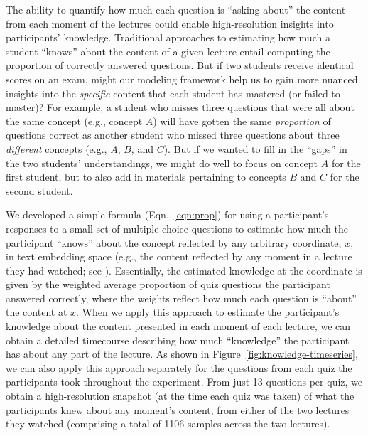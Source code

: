 \documentclass[10pt]{article}
\renewcommand{\nameref}[1]{\mbox{\textit{\oldnameref{#1}}}}
\begin{document}
The ability to quantify how much each question is ``asking about'' the content
from each moment of the lectures could enable high-resolution insights into
participants' knowledge. Traditional approaches to estimating how much a
student ``knows'' about the content of a given lecture entail computing the
proportion of correctly answered questions. But if two students receive
identical scores on an exam, might our modeling framework help us to gain more
nuanced insights into the \textit{specific} content that each student has
mastered (or failed to master)? For example, a student who misses three
questions that were all about the same concept (e.g., concept $A$) will have
gotten the same \textit{proportion} of questions correct as another student who
missed three questions about three \textit{different} concepts (e.g., $A$, $B$,
and $C$). But if we wanted to fill in the ``gaps'' in the two students'
understandings, we might do well to focus on concept $A$ for the first student,
but to also add in materials pertaining to concepts $B$ and $C$ for the second
student.

We developed a simple formula (Eqn.~\ref{eqn:prop}) for using a participant's
responses to a small set of multiple-choice questions to estimate how much the
participant ``knows'' about the concept reflected by any arbitrary coordinate,
$x$, in text embedding space (e.g., the content reflected by any moment in a
lecture they had watched; see \nameref{subsec:traces}).
Essentially, the estimated knowledge at the coordinate is given by the weighted
average proportion of quiz questions the participant answered correctly, where
the weights reflect how much each question is ``about'' the content at $x$.
When we apply this approach to estimate the participant's knowledge about the
content presented in each moment of each lecture, we can obtain a detailed
timecourse describing how much ``knowledge'' the participant has about any part
of the lecture. As shown in Figure~\ref{fig:knowledge-timeseries}, we can also
apply this approach separately for the questions from each quiz the
participants took throughout the experiment. From just 13 questions per quiz,
we obtain a high-resolution snapshot (at the time each quiz was taken) of what
the participants knew about any moment's content, from either of the two
lectures they watched (comprising a total of 1106 samples across the two
lectures).
\end{document}
